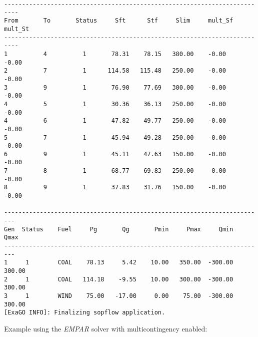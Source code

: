 \begin{lstlisting}
--------------------------------------------------------------------------
From       To       Status     Sft      Stf     Slim     mult_Sf  mult_St
--------------------------------------------------------------------------
1          4          1       78.31    78.15   380.00    -0.00    -0.00
2          7          1      114.58   115.48   250.00    -0.00    -0.00
3          9          1       76.90    77.69   300.00    -0.00    -0.00
4          5          1       30.36    36.13   250.00    -0.00    -0.00
4          6          1       47.82    49.77   250.00    -0.00    -0.00
5          7          1       45.94    49.28   250.00    -0.00    -0.00
6          9          1       45.11    47.63   150.00    -0.00    -0.00
7          8          1       68.77    69.83   250.00    -0.00    -0.00
8          9          1       37.83    31.76   150.00    -0.00    -0.00

-------------------------------------------------------------------------
Gen  Status    Fuel     Pg       Qg       Pmin     Pmax     Qmin     Qmax
-------------------------------------------------------------------------
1     1        COAL    78.13     5.42    10.00   350.00  -300.00   300.00
2     1        COAL   114.18    -9.55    10.00   300.00  -300.00   300.00
3     1        WIND    75.00   -17.00     0.00    75.00  -300.00   300.00
[ExaGO INFO]: Finalizing sopflow application.
\end{lstlisting}

Example using the \emph{EMPAR} solver with multicontingency enabled:

